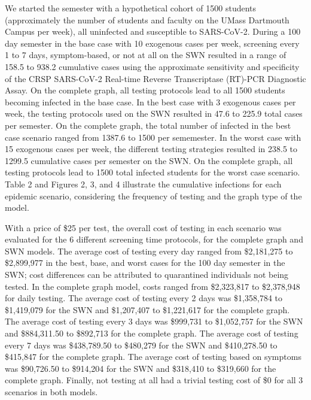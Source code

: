 \documentclass[fullpage]{extarticle}
\begin{document}
\begin{large}
\begin{flushleft}
We started the semester with a hypothetical cohort of 1500 students (approximately the number of students and faculty on the UMass Dartmouth Campus per week), all uninfected and susceptible to SARS-CoV-2. During a 100 day semester in the base case with 10 exogenous cases per week, screening every 1 to 7 days, symptom-based, or not at all on the SWN resulted in a range of 158.5 to 938.2 cumulative cases using the approximate sensitivity and specificity of the CRSP SARS-CoV-2 Real-time Reverse Transcriptase (RT)-PCR Diagnostic Assay. On the complete graph, all testing protocols lead to all 1500 students becoming infected in the base case. In the best case with 3 exogenous cases per week, the testing protocols used on the SWN resulted in 47.6 to 225.9 total cases per semester. On the complete graph, the total number of infected in the best case scenario ranged from 1387.6 to 1500 per sememester. In the worst case with 15 exogenous cases per week, the different testing strategies resulted in 238.5 to 1299.5 cumulative cases per semester on the SWN. On the complete graph, all testing protocols lead to 1500 total infected students for the worst case scenario. Table 2 and Figures 2, 3, and 4 illustrate the cumulative infections for each epidemic scenario, considering the frequency of testing and the graph type of the model.\bigbreak
 
With a price of \$25 per test, the overall cost of testing in each scenario was evaluated for the 6 different screening time protocols, for the complete graph and SWN models. The average cost of testing every day ranged from \$2,181,275 to \$2,899,977 in the best, base, and worst cases for the 100 day semester in the SWN; cost differences can be attributed to quarantined individuals not being tested. In the complete graph model, costs ranged from \$2,323,817 to \$2,378,948 for daily testing. The average cost of testing every 2 days was \$1,358,784 to \$1,419,079 for the SWN and \$1,207,407 to \$1,221,617 for the complete graph. The average cost of testing every 3 days was \$999,731 to \$1,052,757 for the SWN and \$884,311.50 to \$892,713 for the complete graph. The average cost of testing every 7 days was \$438,789.50 to \$480,279 for the SWN and \$410,278.50 to \$415,847 for the complete graph. The average cost of testing based on symptoms was \$90,726.50 to \$914,204 for the SWN and \$318,410 to \$319,660 for the complete graph. Finally, not testing at all had a trivial testing cost of \$0 for all 3 scenarios in both models.



\end{flushleft}
\end{large}
\end{document}
